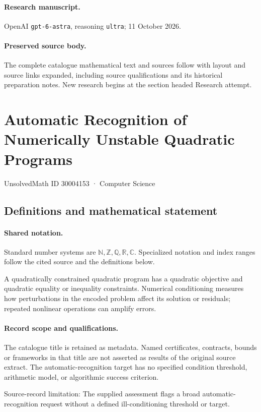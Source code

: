 \documentclass[11pt]{article}
\begin{document}
\paragraph{Research manuscript.} OpenAI \texttt{gpt-6-astra}, reasoning \texttt{ultra}; 11 October 2026.
\paragraph{Preserved source body.} The complete catalogue mathematical text and sources follow with layout and source links expanded, including source qualifications and its historical preparation notes. New research begins at the section headed Research attempt.

\section{Automatic Recognition of Numerically Unstable Quadratic Programs}\label{30004153}
{\small UnsolvedMath ID 30004153 · Computer Science}
\subsection{Definitions and mathematical statement}

\paragraph{Shared notation.}Standard number systems are $\mathbb N,\mathbb Z,\mathbb Q,\mathbb R,\mathbb C$. Specialized notation and index ranges follow the cited source and the definitions below.


A quadratically constrained quadratic program has a quadratic objective and quadratic equality or inequality constraints. Numerical conditioning measures how perturbations in the encoded problem affect its solution or residuals; repeated nonlinear operations can amplify errors.
\paragraph{Record scope and qualifications.}
The catalogue title is retained as metadata. Named certificates, contracts, bounds or frameworks in that title are not asserted as results of the original source extract.
The automatic-recognition target has no specified condition threshold, arithmetic model, or algorithmic success criterion.

Source-record limitation: The supplied assessment flags a broad automatic-recognition request without a defined ill-conditioning threshold or target.
\end{document}
